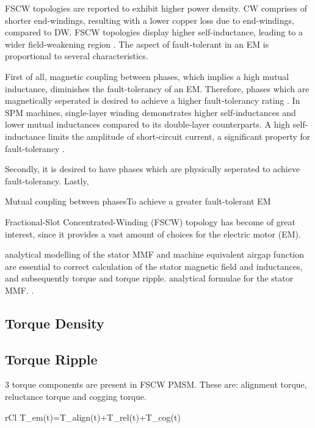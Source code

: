 \documentclass [a4 paper, 11pt, titlepage] {article}
\begin{document}
	FSCW topologies are reported to exhibit higher power density. CW comprises of shorter end-windings, resulting with a lower copper loss due to end-windings, compared to DW. FSCW topologies display higher self-inductance, leading to a wider field-weakening region \cite{farshadnia_advanced_2018}.
	The aspect of fault-tolerant in an EM is proportional to several characteristics.
	
	First of all, magnetic coupling between phases, which implies a high mutual inductance, diminishes the fault-tolerancy of an EM. Therefore, phases which are magnetically seperated is desired to achieve a higher fault-tolerancy rating \cite{bianchi_use_2006}. In SPM machines, single-layer winding demonstrates higher self-inductances and lower mutual inductances compared to its double-layer counterparts. A high self-inductance limits the amplitude of short-circuit current, a significant property for fault-tolerancy \cite{el-refaie_fractional-slot_2010} \cite{ishak_comparison_2006}. 
	
	
	Secondly, it is desired to have phases which are physically seperated to achieve fault-tolerancy\cite{bianchi_use_2006}. Lastly, 
	
	
	Mutual coupling between phasesTo achieve a greater fault-tolerant EM
	
	
	Fractional-Slot Concentrated-Winding (FSCW) topology has become of great interest, since it provides a vast amount of choices for the electric motor (EM). 
	
	analytical modelling of the stator MMF and machine equivalent airgap function are essential to correct calculation of the stator magnetic field and inductances, and subsequently torque and torque ripple. analytical formulae for the stator MMF. \cite{farshadnia_advanced_2018}.
	
	\subsection{Torque Density}
	
	\subsection{Torque Ripple}
	3 torque components are present in FSCW PMSM. These are: alignment torque, reluctance torque and cogging torque.
	\begin{IEEEeqnarray*}{rCl}
		T_{em}(t)=T_{align}(t)+T_{rel}(t)+T_{cog}(t)
	\end{IEEEeqnarray*}
	
\end{document}
